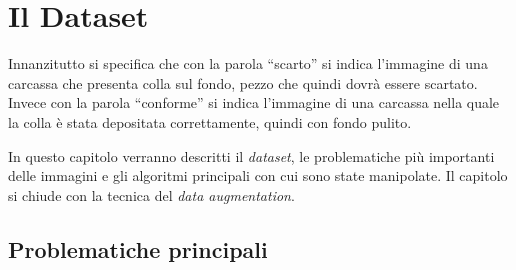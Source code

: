 
\chapter{Il Dataset}

Innanzitutto si specifica che con la parola ``scarto'' si indica l'immagine di una carcassa che presenta colla sul fondo, pezzo che quindi dovrà essere scartato.
Invece con la parola ``conforme'' si indica l'immagine di una carcassa nella quale la colla è stata depositata correttamente, quindi con fondo pulito.

In questo capitolo verranno descritti il \textit{dataset}, le problematiche più importanti delle immagini e gli algoritmi principali con cui sono state manipolate.
Il capitolo si chiude con la tecnica del \textit{data augmentation}.

\section{Problematiche principali}


